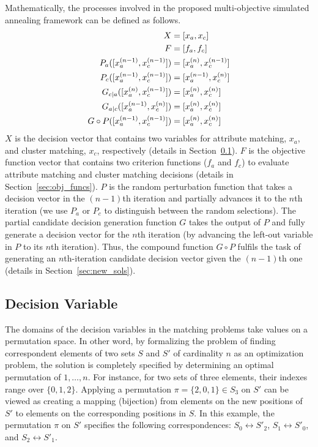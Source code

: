 Mathematically, the processes involved in the proposed multi-objective simulated annealing framework can be defined as follows.
\begin{align}
\notag X&=[x_a, x_c]\\
\notag F&=[f_a, f_c]\\
\notag P_a([x_a^{(n-1)},x_c^{(n-1)}])&=[x_a^{(n)}, x_c^{(n-1)}]\\
\notag P_c([x_a^{(n-1)},x_c^{(n-1)}])&=[x_a^{(n-1)}, x_c^{(n)}]\\
\notag G_{c|a}([x_a^{(n)},x_c^{(n-1)}])&=[x_a^{(n)}, x_c^{(n)}]\\
\notag G_{a|c}([x_a^{(n-1)},x_c^{(n)}])&=[x_a^{(n)}, x_c^{(n)}]\\
\notag G\circ P([x_a^{(n-1)},x_c^{(n-1)}])&=[x_a^{(n)}, x_c^{(n)}]
\end{align}
$X$ is the decision vector that contains two variables for attribute matching, $x_a$, and cluster matching, $x_c$, respectively (details in Section~\ref{sec:variables}). $F$ is the objective function vector that contains two criterion functions ($f_a$ and $f_c$) to evaluate attribute matching and cluster matching decisions (details in Section~\ref{sec:obj_funcs}). $P$ is the random perturbation function that takes a decision vector in the $(n-1)$th iteration and partially advances it to the $n$th iteration (we use $P_a$ or $P_c$ to distinguish between the random selections). The partial candidate decision generation function $G$ takes the output of $P$ and fully generate a decision vector for the $n$th iteration (by advancing the left-out variable in $P$ to its $n$th iteration). Thus, the compound function $G\circ P$ fulfils the task of generating an $n$th-iteration candidate decision vector given the $(n-1)$th one (details in Section~\ref{sec:new_sols}).
\subsection{Decision Variable}
\label{sec:variables}
The domains of the decision variables in the matching problems take values on a permutation space. In other word, by formalizing the problem of finding correspondent elements of two sets $S$ and $S'$ of cardinality $n$ as an optimization problem, the solution is completely specified by determining an optimal permutation of ${1,\ldots,n}$. For instance, for two sets of three elements, their indexes range over $\{0, 1, 2\}$. Applying a permutation $\pi =\{2, 0, 1\} \in S_3$ on $S'$ can be viewed as creating a mapping (bijection) from elements on the new positions of $S'$ to elements on the corresponding positions in $S$. %
In this example, the permutation $\pi$ on $S'$ specifies the following correspondences: $S_0 \leftrightarrow S'_2$, $S_1 \leftrightarrow S'_0$, and $S_2 \leftrightarrow S'_1$.

